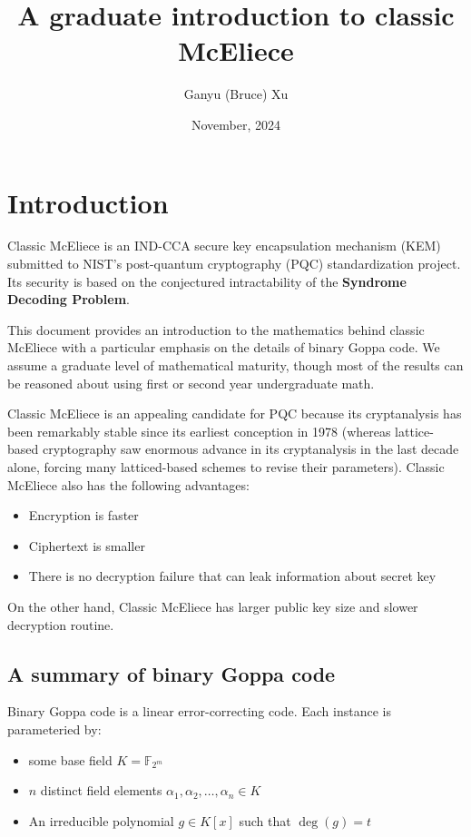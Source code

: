 \documentclass{article}
\title{
    A graduate introduction to classic McEliece
}
\author{
    Ganyu (Bruce) Xu
}
\date{November, 2024}
\begin{document}
\maketitle

\section{Introduction}
Classic McEliece is an IND-CCA secure key encapsulation mechanism (KEM) submitted to NIST's post-quantum cryptography (PQC) standardization project. Its security is based on the conjectured intractability of the \textbf{Syndrome Decoding Problem}.

This document provides an introduction to the mathematics behind classic McEliece with a particular emphasis on the details of binary Goppa code. We assume a graduate level of mathematical maturity, though most of the results can be reasoned about using first or second year undergraduate math.

Classic McEliece is an appealing candidate for PQC because its cryptanalysis has been remarkably stable since its earliest conception in 1978 \cite{mceliece1978public} (whereas lattice-based cryptography saw enormous advance in its cryptanalysis in the last decade alone, forcing many latticed-based schemes to revise their parameters). Classic McEliece also has the following advantages: \begin{itemize}
    \item Encryption is faster
    \item Ciphertext is smaller
    \item There is no decryption failure that can leak information about secret key
\end{itemize}

On the other hand, Classic McEliece has larger public key size and slower decryption routine.

\subsection{A summary of binary Goppa code}
Binary Goppa code is a linear error-correcting code. Each instance is parameteried by: \begin{itemize}
    \item some base field $K = \mathbb{F}_{2^m}$
    \item $n$ distinct field elements $\alpha_1, \alpha_2, \ldots, \alpha_n \in K$
    \item An irreducible polynomial $g \in K[x]$ such that $\deg(g) = t$
\end{itemize} 
\end{document}
